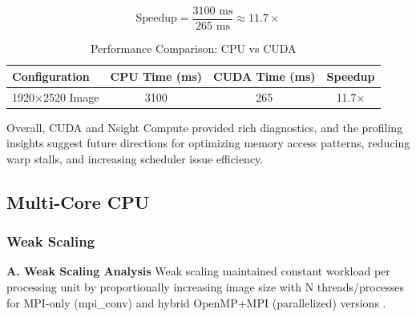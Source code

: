 \documentclass[conference, 10pt]{IEEEtran}
\begin{document}
\[
\text{Speedup} = \frac{3100\text{ ms}}{265\text{ ms}} \approx 11.7\times
\]

\begin{table}[H]
    \centering
    \caption{Performance Comparison: CPU vs CUDA}
    \label{tab:speedup-table}
    \begin{tabular}{@{}lccc@{}}
        \toprule
        \textbf{Configuration} & \textbf{CPU Time (ms)} & \textbf{CUDA Time (ms)} & \textbf{Speedup} \\
        \midrule
        1920$\times$2520 Image & 3100 & 265 & 11.7$\times$ \\
        \bottomrule
    \end{tabular}
\end{table}

Overall, CUDA and Nsight Compute provided rich diagnostics, and the profiling insights suggest future directions for optimizing memory access patterns, reducing warp stalls, and increasing scheduler issue efficiency.




\subsection{\textbf{Multi-Core CPU}}

\subsubsection{\textbf{Weak Scaling}}

\textbf{A. Weak Scaling Analysis}
Weak scaling maintained constant workload per processing unit by proportionally increasing image size with N threads/processes for MPI-only (mpi\_conv) and hybrid OpenMP+MPI (parallelized) versions \cite{Gustafson1988}.
\end{document}
